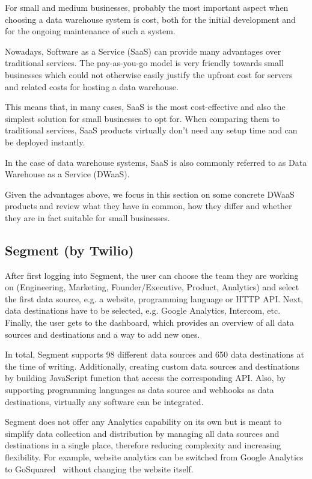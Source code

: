 \documentclass[../paper.tex]{subfiles}
\begin{document}
For small and medium businesses, probably the most important aspect when
choosing a data warehouse system is cost, both for the initial development and
for the ongoing maintenance of such a system.

Nowadays, Software as a Service (SaaS) can provide many advantages over
traditional services. The pay-as-you-go model is very friendly towards small
businesses which could not otherwise easily justify the upfront cost for
servers and related costs for hosting a data warehouse.

This means that, in many cases, SaaS is the most cost-effective and also the
simplest solution for small businesses to opt for. When comparing them to
traditional services, SaaS products virtually don't need any setup time and
can be deployed instantly.

In the case of data warehouse systems, SaaS is also commonly referred to as
Data Warehouse as a Service (DWaaS).

Given the advantages above, we focus in this section on some concrete DWaaS
products and review what they have in common, how they differ and whether they
are in fact suitable for small businesses.

\subsection{Segment (by Twilio)}

After first logging into Segment, the user can choose the team they are working on (Engineering, Marketing, Founder/Executive, Product, Analytics) and select the first data source, e.g. a website, programming language or HTTP API. Next, data destinations have to be selected, e.g. Google Analytics, Intercom, etc. Finally, the user gets to the dashboard, which provides an overview of all data sources and destinations and a way to add new ones.

In total, Segment supports 98 different data sources and 650 data destinations at the time of writing. Additionally, creating custom data sources and destinations by building JavaScript function that access the corresponding API. Also, by supporting programming languages as data source and webhooks as data destinations, virtually any software can be integrated.

Segment does not offer any Analytics capability on its own but is meant to simplify data collection and distribution by managing all data sources and destinations in a single place, therefore reducing complexity and increasing flexibility. For example, website analytics can be switched from Google Analytics~\cite{google_analytics} to GoSquared~\cite{gosquared} without changing the website itself.
\end{document}
